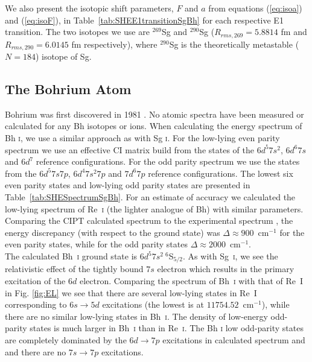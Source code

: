 \documentclass[10pt,a4paper, twoside]{report}
\begin{document}
We also present the isotopic shift parameters, $F$ and $a$ from equations (\ref{eq:isoa}) and (\ref{eq:isoF}), in Table~\ref{tab:SHEE1transitionSgBh} for each respective E1 transition. The two isotopes we use are $^{269}$Sg  and $^{290}$Sg ($R_{rms,\text{269}} = 5.8814$ fm and $R_{rms,\text{290}}  = 6.0145$ fm respectively),  where $^{290}$Sg is the theoretically  metastable ($N=184$) isotope of Sg. 

\subsection{The Bohrium Atom}  \label{sec:Bh}

 Bohrium was first discovered in 1981 \cite{Munzenberg1981}. No atomic spectra have been measured or calculated for any Bh isotopes or ions. When calculating the energy spectrum of Bh \textsc{i}, we use a similar approach as with Sg \textsc{i}.  For the low-lying even parity spectrum we use an effective CI matrix build from the states of the $6d^5 7s^2$, $6d^6 7s$ and $6d^7$ reference configurations. For the odd parity spectrum we use the states from the $6d^5 7s 7p$, $6d^4 7s^2 7p$ and $7d^6 7p$ reference configurations. The lowest six even parity states and low-lying odd parity states are presented in Table~\ref{tab:SHESpectrumSgBh}. For an estimate of accuracy we calculated the low-lying spectrum of Re~\textsc{i} (the lighter analogue of Bh) with similar parameters. Comparing the CIPT calculated spectrum to the experimental spectrum \cite{NIST_ASD}, the energy discrepancy (with respect to the ground state) was $\Delta \approx 900$~cm$^{-1}$ for the even parity states, while for the odd parity states $\Delta \approx 2000$~cm$^{-1}$.\\
\linebreak
 The calculated Bh~\textsc{i} ground state is $6d^5 7s^2 \ ^6$S$_{5/2}$.  As with Sg~\textsc{i},  we see the relativistic effect of the tightly bound $7s$ electron which results in the primary excitation of the $6d$ electron. Comparing the spectrum of Bh~\textsc{i} with that of Re~\textsc{I} in Fig. \ref{fig:EL} we see that there are several low-lying states in Re~\textsc{I} corresponding to $6s \rightarrow 5d$ excitations (the lowest is at $11 754.52$~cm$^{-1}$), while there are no similar low-lying states in Bh~\textsc{i}.  The density of low-energy odd-parity states is much larger in Bh~\textsc{i} than in Re~\textsc{i}. The Bh \textsc{i} low odd-parity states are completely dominated by the $6d \rightarrow 7p$ excitations in calculated spectrum and and there are no  $7s \rightarrow 7p$ excitations. 
\end{document}
